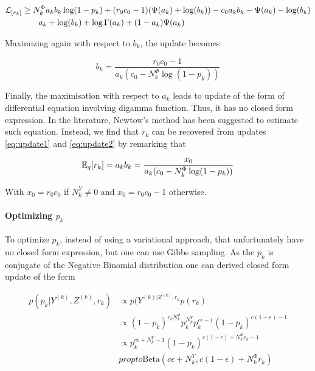 \begin{align*}
\mathcal{L}_{[r_k]} &\geq N^\Phi_k a_k b_k \log(1-p_k) + (r_0 c_0-1 )(\Psi(a_k) + \log(b_k)) -c_0 a_k b_k -\Psi(a_k) - \log(b_k)  \\
&\qquad a_k + \log(b_k) +\log \Gamma(a_k) + (1-a_k)\Psi(a_k)
\end{align*}

Maximizing again with respect to $b_k$, the update becomes

\begin{equation} \label{eq:update2}
b_k = \frac{r_0 c_0-1}{a_k (c_0 - N^\Phi_k \log(1-p_k))}
\end{equation}

Finally, the maximisation with respect to $a_k$ leads to update of the form of differential equation involving digamma function. Thus, it has no closed form expression. In the literature, Newtow's method has been suggested to estimate such equation. Instead, we find that $r_k$ can be recovered from updates \eqref{eq:update1} and \eqref{eq:update2} by remarking that

\begin{equation}
\mathbb{E}_q[r_k] = a_k b_k = \frac{x_0}{a_k (c_0 - N^\Phi_k \log(1-p_k))}
\end{equation}

With $x_0=r_0 c_0$ if $N^Y_k \neq 0$ and $x_0=r_0 c_0-1$ otherwise.



\paragraph{Optimizing $p_k$}

To optimize $p_k$, instead of using a variational approach, that unfortunately have no closed form expression, but one can use Gibbs sampling. As the $p_k$ is conjugate of the Negative Binomial distribution one can derived closed form update of the form

\begin{align*}
p(p_k | Y^{(k)}, Z^{(k)}, r_k) &\propto p(Y^{(k)| Z^{(k)}, r_k} p(r_k) \\
                               &\propto (1-p_k)^{r_k N^\Phi_k}p_k^{N^Y_k} p_k^{c\epsilon -1} (1-p_k)^{c(1-\epsilon) -1}\\
                               &\propto p_k^{c\epsilon + N^Y_{k} -1} (1-p_k)^{c(1-\epsilon) + N^\Phi_{k}r_k-1}\\
                               &propto \mathrm{Beta}(c\epsilon + N^Y_{k}, c(1-\epsilon) + N^\Phi_{k}r_k)
\end{align*}

